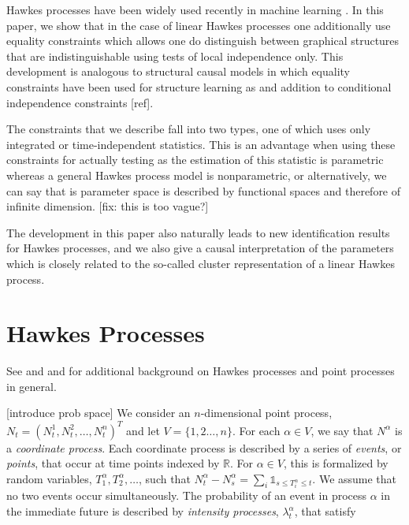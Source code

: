 \documentclass[accepted]{uai2021} %
\begin{document}
Hawkes processes have been widely used recently in machine learning 
\cite{zhou2013, zhou2013b,luo2015,etesami2016,tan2018,xu2018,trouleau2019} . 
In this paper, we show that in the case of linear Hawkes processes one 
additionally 
use equality 
constraints which allows one do distinguish between graphical structures that 
are indistinguishable using tests of local independence only. This development 
is analogous to structural causal models in which equality constraints have 
been used for structure learning as and addition to conditional independence 
constraints [ref].

The constraints that we describe fall into two types, one of which uses only 
integrated or time-independent statistics. This is an advantage when using 
these constraints for actually testing as the estimation of this statistic is 
parametric whereas a general Hawkes process model is nonparametric, or 
alternatively, we can say that is parameter space is described by functional 
spaces and therefore of infinite dimension. [fix: this is too vague?]

The development in this paper also naturally leads to new identification 
results for Hawkes processes, 
and we also give a causal interpretation of the parameters which is closely 
related to the so-called cluster representation of a linear Hawkes process.




\section{Hawkes Processes}
\label{sec:hawPro}

See \cite{laubHawkes2015} and \cite{linigerThesis} and \cite{daleyVere} for 
additional background on Hawkes processes and point processes in general.

[introduce prob space]
We consider an $n$-dimensional point process, $N_t = 
(N_t^1,N_t^2,\ldots,N_t^n)^T$ and let $V= \{1,2\ldots, n\}$. For each 
$\alpha\in 
V$, we say that $N^\alpha$ is a \emph{coordinate process}. Each coordinate 
process is described by a series of \emph{events}, or \emph{points}, that occur 
at time points indexed by $\mathbb{R}$. For $\alpha \in V$, this is formalized 
by random variables, $T_1^\alpha, T_2^\alpha, \ldots$, such that $N_t^\alpha - 
N_s^\alpha = \sum_i \mathds{1}_{s \leq T_i^\alpha \leq t}$. We assume that no 
two events occur simultaneously. The probability of an event in process 
$\alpha$ in the immediate 
future is described by \emph{intensity processes}, $\lambda_t^\alpha$, that 
satisfy
\end{document}
